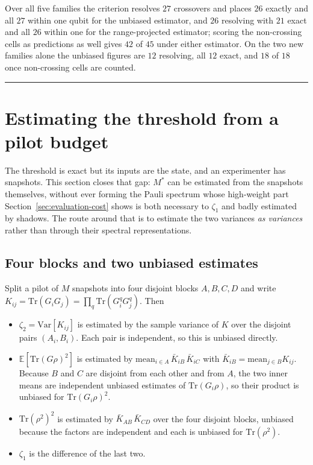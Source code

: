 \documentclass[a4paper,superscriptaddress,nofootinbib,onecolumn,nopdfoutputerror]{quantumarticle}
\providecommand{\tightlist}{\setlength{\itemsep}{0pt}\setlength{\parskip}{0pt}}
\begin{document}
Over all five families the criterion resolves \(27\) crossovers and places \(26\) exactly and all
\(27\) within one qubit for the unbiased estimator, and \(26\) resolving with \(21\) exact and all
\(26\) within one for the range-projected estimator; scoring the non-crossing cells as
predictions as well gives \(42\) of \(45\) under either estimator. On the two new families alone
the unbiased figures are \(12\) resolving, all \(12\) exact, and \(18\) of \(18\) once
non-crossing cells are counted.

\begin{center}\rule{0.5\linewidth}{0.5pt}\end{center}

\hypertarget{estimating-the-threshold-from-a-pilot-budget}{%
\section{Estimating the threshold from a pilot budget}\label{sec:pilot}}

The threshold is exact but its inputs are the state, and an experimenter has snapshots. This
section closes that gap: \(M^*\) can be estimated from the snapshots themselves, without ever
forming the Pauli spectrum whose high-weight part Section~\ref{sec:evaluation-cost} shows is both
necessary to \(\zeta_1\) and badly estimated by shadows. The route around that is to estimate the
two variances \emph{as variances} rather than through their spectral representations.

\hypertarget{four-blocks-and-two-unbiased-estimates}{%
\subsection{Four blocks and two unbiased estimates}\label{four-blocks-and-two-unbiased-estimates}}

Split a pilot of \(M\) snapshots into four disjoint blocks \(A, B, C, D\) and write
\(K_{ij} = \mathrm{Tr}(G_i G_j) = \prod_q \mathrm{Tr}(G_i^q G_j^q)\). Then

\begin{itemize}
\tightlist
\item \(\zeta_2 = \mathrm{Var}[K_{ij}]\) is estimated by the sample variance of \(K\) over the
disjoint pairs \((A_i, B_i)\). Each pair is independent, so this is unbiased directly.
\item \(\mathbb{E}[\mathrm{Tr}(G\rho)^2]\) is estimated by
\(\mathrm{mean}_{i \in A}\, \bar K_{iB}\,\bar K_{iC}\) with
\(\bar K_{iB} = \mathrm{mean}_{j\in B} K_{ij}\). Because \(B\) and \(C\) are disjoint from each
other and from \(A\), the two inner means are independent unbiased estimates of
\(\mathrm{Tr}(G_i\rho)\), so their product is unbiased for \(\mathrm{Tr}(G_i\rho)^2\).
\item \(\mathrm{Tr}(\rho^2)^2\) is estimated by \(\bar K_{AB}\,\bar K_{CD}\) over the four
disjoint blocks, unbiased because the factors are independent and each is unbiased for
\(\mathrm{Tr}(\rho^2)\).
\item \(\zeta_1\) is the difference of the last two.
\end{itemize}
\end{document}
